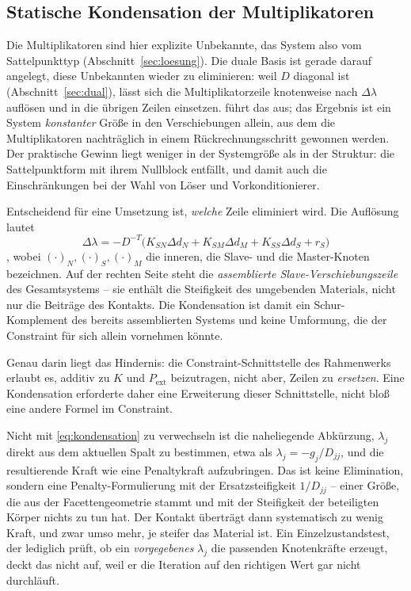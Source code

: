 \documentclass[a4paper,11pt]{article}
\def\bm#1{#1}%
\def\tilde#1{#1}%
\begin{document}
\subsection{Statische Kondensation der Multiplikatoren}
\label{sec:ausblick:kondensation}

Die Multiplikatoren sind hier explizite Unbekannte, das System also vom Sattelpunkttyp
(Abschnitt~\ref{sec:loesung}). Die duale Basis ist gerade darauf angelegt, diese Unbekannten wieder
zu eliminieren: weil $\tilde{\bm D}$ diagonal ist (Abschnitt~\ref{sec:dual}), lässt sich die
Multiplikatorzeile knotenweise nach $\Delta\bm\lambda$ auflösen und in die übrigen Zeilen einsetzen.
\citet[Gl.~(3.62)--(3.65)]{farah} führt das aus; das Ergebnis ist ein System \emph{konstanter}
Größe in den Verschiebungen allein, aus dem die Multiplikatoren nachträglich in einem
Rückrechnungsschritt gewonnen werden. Der praktische Gewinn liegt weniger in der Systemgröße als in
der Struktur: die Sattelpunktform mit ihrem Nullblock entfällt, und damit auch die Einschränkungen
bei der Wahl von Löser und Vorkonditionierer.

Entscheidend für eine Umsetzung ist, \emph{welche} Zeile eliminiert wird. Die Auflösung lautet
\begin{equation}
\Delta\bm\lambda = -\tilde{\bm D}^{-T}\big(\bm K_{SN}\Delta\bm d_N + \tilde{\bm K}_{SM}\Delta\bm d_M
+ \tilde{\bm K}_{SS}\Delta\bm d_S + \bm r_S\big)
\label{eq:kondensation}
\end{equation}
\citep[Gl.~(3.63)]{farah}, wobei $(\cdot)_N,(\cdot)_S,(\cdot)_M$ die inneren, die Slave- und die
Master-Knoten bezeichnen. Auf der rechten Seite steht die \emph{assemblierte Slave-Verschiebungs\-zeile}
des Gesamtsystems -- sie enthält die Steifigkeit des umgebenden Materials, nicht nur die Beiträge
des Kontakts. Die Kondensation ist damit ein Schur-Komplement des bereits assemblierten Systems und
keine Umformung, die der Constraint für sich allein vornehmen könnte.

Genau darin liegt das Hindernis: die Constraint-Schnittstelle des Rahmenwerks erlaubt es, additiv
zu $\bm K$ und $\bm P_{\text{ext}}$ beizutragen, nicht aber, Zeilen zu \emph{ersetzen}. Eine
Kondensation erforderte daher eine Erweiterung dieser Schnittstelle, nicht bloß eine andere Formel
im Constraint.

Nicht mit \eqref{eq:kondensation} zu verwechseln ist die naheliegende Abkürzung, $\lambda_j$ direkt
aus dem aktuellen Spalt zu bestimmen, etwa als $\lambda_j=-\tilde g_j/\tilde D_{jj}$, und die
resultierende Kraft wie eine Penaltykraft aufzubringen. Das ist keine Elimination, sondern eine
Penalty-Formulierung mit der Ersatzsteifigkeit $1/\tilde D_{jj}$ -- einer Größe, die aus der
Facettengeometrie stammt und mit der Steifigkeit der beteiligten Körper nichts zu tun hat. Der
Kontakt überträgt dann systematisch zu wenig Kraft, und zwar umso mehr, je steifer das Material
ist. Ein Einzelzustandstest, der lediglich prüft, ob ein \emph{vorgegebenes} $\lambda_j$ die
passenden Knotenkräfte erzeugt, deckt das nicht auf, weil er die Iteration auf den richtigen Wert
gar nicht durchläuft.
\end{document}
